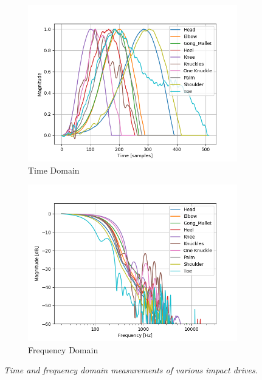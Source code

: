 \documentclass[twoside,a4paper]{article}
\begin{document}
\begin{figure}
\centering
    \begin{subfigure}[b]{\columnwidth}
         \centering
         \includegraphics[width=\linewidth,trim={0 0 1cm 1cm},clip]{../Figures/Impacts_time}
         \caption{Time Domain}
    \end{subfigure}
    \begin{subfigure}[b]{\columnwidth}
         \centering
         \includegraphics[width=\linewidth,trim={0 0 1cm 1cm},clip]{../Figures/Impacts_freq}
         \caption{Frequency Domain}
    \end{subfigure}
    \caption{\it{Time and frequency domain measurements of various impact drives.}}
    \label{fig:impact}
\end{figure}
\end{document}
